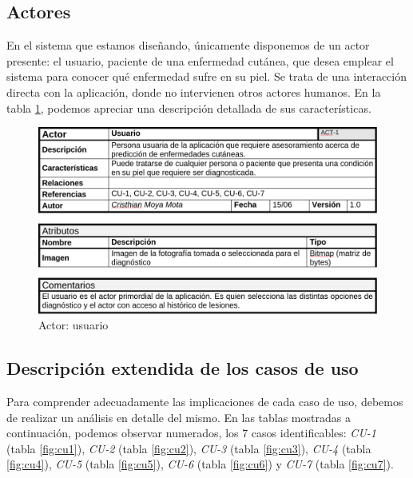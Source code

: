\subsection{Actores}

En el sistema que estamos diseñando, únicamente disponemos de un actor presente: el usuario, paciente de una enfermedad cutánea, que desea emplear el sistema para conocer qué enfermedad sufre en su piel. Se trata de una interacción directa con la aplicación, donde no intervienen otros actores humanos. En la tabla \ref{fig:actorusuario}, podemos apreciar una descripción detallada de sus características.

  \begin{figure}[H]
	\centering
	\includegraphics[scale = 0.2]{imagenes/tablausuario.png}
	\caption{Actor: usuario}
	\label{fig:actorusuario}
\end{figure}

\subsection	{Descripción extendida de los casos de uso}

Para comprender adecuadamente las implicaciones de cada caso de uso, debemos de realizar un análisis en detalle del mismo. En las tablas mostradas a continuación, podemos observar numerados, los 7 casos identificables: \textit{CU-1} (tabla \ref{fig:cu1}), \textit{CU-2} (tabla \ref{fig:cu2}), \textit{CU-3} (tabla \ref{fig:cu3}), \textit{CU-4} (tabla \ref{fig:cu4}), \textit{CU-5} (tabla \ref{fig:cu5}), \textit{CU-6} (tabla \ref{fig:cu6}) y \textit{CU-7} (tabla \ref{fig:cu7}).

